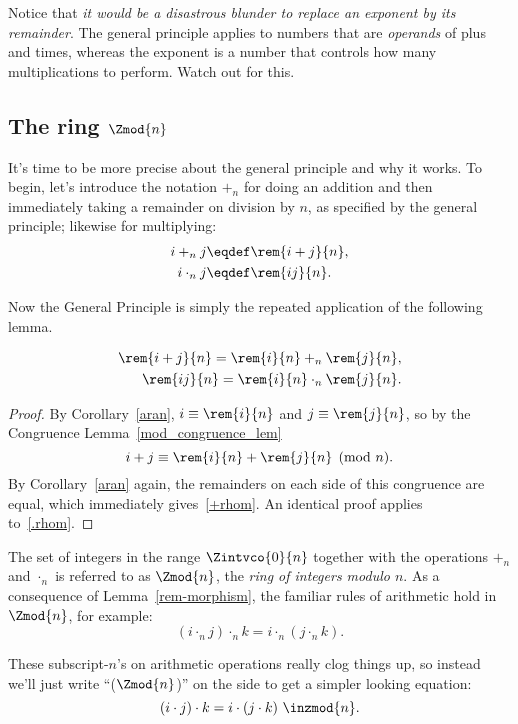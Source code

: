 Notice that \emph{it would be a disastrous blunder to replace an
  exponent by its remainder}.  The general principle applies to
numbers that are \emph{operands} of plus and times, whereas the
exponent is a number that controls how many multiplications to
perform.  Watch out for this.

\subsection{The ring $\Zmod{n}$}\label{subsec:ringZn}

It's time to be more precise about the general principle and why it
works.  To begin, let's introduce the notation $+_n$ for doing an
addition and then immediately taking a remainder on division by $n$,
as specified by the general principle; likewise for multiplying:
\begin{align*}
i +_n j & \eqdef \rem{i+j}{n},\\
i \cdot_n j & \eqdef \rem{ij}{n}.
\end{align*}

Now the General Principle is simply the repeated application of the
following lemma.
\begin{lemma}\label{rem-morphism}
\begin{align}
\rem{i+j}{n} = \rem{i}{n} +_n \rem{j}{n},\label{+rhom}\\
\rem{ij}{n} = \rem{i}{n} \cdot_n \rem{j}{n}.\label{.rhom}
\end{align}
\end{lemma}

\begin{proof}
By Corollary~\ref{aran}, $i \equiv \rem{i}{n}$ and $j \equiv
\rem{j}{n}$, so by the Congruence Lemma~\ref{mod_congruence_lem}
\[
i + j \equiv \rem{i}{n} + \rem{j}{n} \pmod{n}.
\]
By Corollary~\ref{aran} again, the remainders on each side of this
congruence are equal, which immediately gives~\eqref{+rhom}.  An
identical proof applies to~\eqref{.rhom}.
\end{proof}

The set of integers in the range $\Zintvco{0}{n}$ together with the
operations $+_n$ and $\cdot_n$ is referred to as $\Zmod{n}$, the%
%
 \emph{ring of integers modulo $n$}.
As a consequence of Lemma~\ref{rem-morphism}, the familiar rules of
arithmetic hold in $\Zmod{n}$, for example:
\[
(i \cdot_n j) \cdot_n k = i \cdot_n (j \cdot_n k).
\]

These subscript-$n$'s on arithmetic operations really clog things up,
so instead we'll just write ``($\Zmod{n}$)'' on the side to get a
simpler looking equation:
\[
(i \cdot j) \cdot k = i \cdot (j \cdot k) \ \inzmod{n}.
\]

